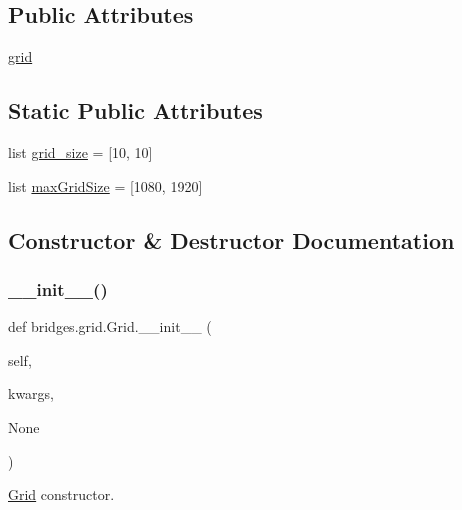 \subsection*{Public Attributes}
\begin{DoxyCompactItemize}
\item 
\mbox{\hyperlink{classbridges_1_1grid_1_1_grid_a609e662d769bbda34e88dd2be0307f4f}{grid}}
\end{DoxyCompactItemize}
\subsection*{Static Public Attributes}
\begin{DoxyCompactItemize}
\item 
list \mbox{\hyperlink{classbridges_1_1grid_1_1_grid_ac2ef408fca86892aceba252d1044fdee}{grid\+\_\+size}} = \mbox{[}10, 10\mbox{]}
\item 
list \mbox{\hyperlink{classbridges_1_1grid_1_1_grid_a5585d466b6738e4eee71a7dda56b4153}{max\+Grid\+Size}} = \mbox{[}1080, 1920\mbox{]}
\end{DoxyCompactItemize}


\subsection{Constructor \& Destructor Documentation}
\mbox{\label{classbridges_1_1grid_1_1_grid_a25587e3c0f450b336fc7bb11fc718c36}} 
\subsubsection{\texorpdfstring{\+\_\+\+\_\+init\+\_\+\+\_\+()}{\_\_init\_\_()}}
{\footnotesize\ttfamily def bridges.\+grid.\+Grid.\+\_\+\+\_\+init\+\_\+\+\_\+ (\begin{DoxyParamCaption}\item[{}]{self,  }\item[{}]{kwargs,  }\item[{}]{None }\end{DoxyParamCaption})}



\mbox{\hyperlink{classbridges_1_1grid_1_1_grid}{Grid}} constructor. 


